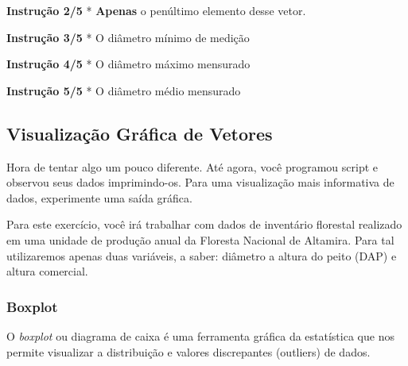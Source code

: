\documentclass[
]{article}
\newenvironment{Shaded}{\begin{snugshade}}{\end{snugshade}}
\begin{document}
\textbf{Instrução 2/5} * \textbf{Apenas} o penúltimo elemento desse
vetor.

\textbf{Instrução 3/5} * O diâmetro mínimo de medição

\begin{Shaded}
\begin{Highlighting}[]

\end{Highlighting}
\end{Shaded}

\textbf{Instrução 4/5} * O diâmetro máximo mensurado

\begin{Shaded}
\begin{Highlighting}[]

\end{Highlighting}
\end{Shaded}

\textbf{Instrução 5/5} * O diâmetro médio mensurado

\begin{Shaded}
\begin{Highlighting}[]

\end{Highlighting}
\end{Shaded}

\hypertarget{visualizauxe7uxe3o-gruxe1fica-de-vetores}{%
\subsection{Visualização Gráfica de
Vetores}\label{visualizauxe7uxe3o-gruxe1fica-de-vetores}}

Hora de tentar algo um pouco diferente. Até agora, você programou script
e observou seus dados imprimindo-os. Para uma visualização mais
informativa de dados, experimente uma saída gráfica.

Para este exercício, você irá trabalhar com dados de inventário
florestal realizado em uma unidade de produção anual da Floresta
Nacional de Altamira. Para tal utilizaremos apenas duas variáveis, a
saber: diâmetro a altura do peito (DAP) e altura comercial.

\hypertarget{boxplot}{%
\subsubsection{Boxplot}\label{boxplot}}

O \emph{boxplot} ou diagrama de caixa é uma ferramenta gráfica da
estatística que nos permite visualizar a distribuição e valores
discrepantes (outliers) de dados.
\end{document}
